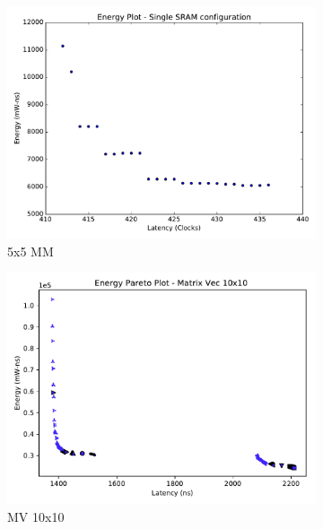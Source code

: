 \begin{figure}[ht]
\centering
\begin{subfigure}{.33\textwidth}
  \centering
  \includegraphics[width=\textwidth]{graphs/energy_plot_single_sram.pdf}
  \caption{5x5 MM}
  \label{fig:single_sram}
\end{subfigure}%
\begin{subfigure}{.33\textwidth}
  \centering
  \includegraphics[width=\textwidth]{graphs/EnergyParetoMatrixVec10.pdf}
  \caption{MV 10x10}
  \label{fig:sram_vs_mram_pareto_vec}
\end{subfigure}
\begin{subfigure}{.33\textwidth}
  \centering

\end{subfigure}
\end{figure}
